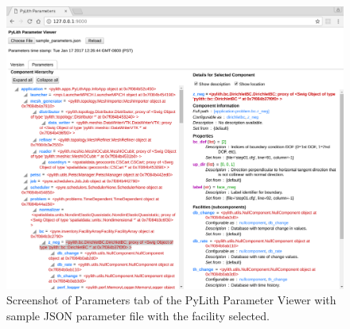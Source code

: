 \begin{figure}[htbp]
  \includegraphics[width=5in]{runpylith/figs/paramgui_detail} 
  \caption{Screenshot of \textsf{Parameters} tab of the PyLith Parameter Viewer
    with sample JSON parameter file with the  facility
    selected.}
  \label{fig:parameters:gui:parameters:selected} 
\end{figure}


